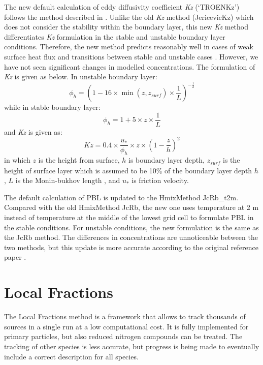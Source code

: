 The new default calculation of eddy diffusivity coefficient \textit{Kz} (`TROENKz') follows the method described in \citet{troenkz}. Unlike the old \textit{Kz} method (JericevicKz) which does not consider the stability within the boundary layer, this new \textit{Kz} method differentiates \textit{Kz} formulation in the stable and unstable boundary layer conditions. Therefore, the new method predicts reasonably well in cases of weak surface heat flux and transitions between stable and unstable cases \citep{troenkz}. However, we have not seen significant changes in modelled concentrations. The formulation of \textit{Kz} is given as below. In unstable boundary layer:
\begin{equation}
    \phi_h = (1 - 16 \times \min(z, z_\mathit{surf}) \times \frac{1}{L})^{-\frac 1 2}
\end{equation}
while in stable boundary layer:
\begin{equation}
    \phi_h = 1 + 5 \times z \times \frac{1}{L}
\end{equation}
and \textit{Kz} is given as: 
\begin{equation}
    \mathit{Kz} = 0.4 \times \frac{u_*}{\phi_h} \times z \times (1 - \frac z h)^2
\end{equation}
in which $z$ is the height from surface, $h$ is boundary layer depth, $z_\mathit{surf}$ is the height of surface layer which is assumed to be 10\% of the boundary layer depth $h$,  $L$ is the Monin-bukhov length \citep{Garratt}, and $u_*$ is friction velocity.

The default calculation of PBL is updated to the HmixMethod JcRb\_t2m. Compared with the old HmixMethod JcRb, the new one uses temperature at 2 m instead of temperature at the middle of the lowest grid cell to formulate PBL in the stable conditions. For unstable conditions, the new formulation is the same as the JcRb method. The differences in concentrations are unnoticeable between the two methods, but this update is more accurate according to the original reference paper \citep{JcRb}.  


\section{Local Fractions}
\label{sec:updateLF}

The Local Fractions method \citep{wind-2020} is a framework that allows to track thousands of sources in a single run at a low computational cost. It is fully implemented for primary particles, but also reduced nitrogen compounds can be treated. The tracking of other species is less accurate, but progress is being made to eventually include a correct description for all species.

